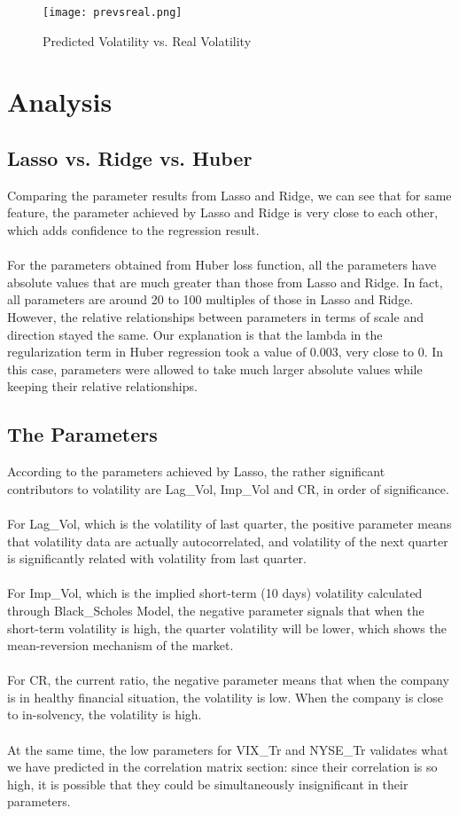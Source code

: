\documentclass[a4paper]{article}
\begin{document}
\begin{figure}[h]
\centering
\texttt{[image: prevsreal.png]}
\caption{\label{fig:scatter plot}Predicted Volatility vs. Real Volatility}
\end{figure}

\section{Analysis}
\subsection{Lasso vs. Ridge vs. Huber}
Comparing the parameter results from Lasso and Ridge, we can see that for same feature, the parameter achieved by Lasso and Ridge is very close to each other, which adds confidence to the regression result.
\\\\For the parameters obtained from Huber loss function, all the parameters have absolute values that are much greater than those from Lasso and Ridge. In fact, all parameters are around 20 to 100 multiples of those in Lasso and Ridge. However, the relative relationships between parameters in terms of scale and direction stayed the same. Our explanation is that the lambda in the regularization term in Huber regression took a value of 0.003, very close to 0. In this case, parameters were allowed to take much larger absolute values while keeping their relative relationships.
\subsection{The Parameters}
According to the parameters achieved by Lasso, the rather significant contributors to volatility are Lag\_Vol, Imp\_Vol and CR, in order of significance. 
\\\\For Lag\_Vol, which is the volatility of last quarter, the positive parameter means that volatility data are actually autocorrelated, and volatility of the next quarter is significantly related with volatility from last quarter.
\\\\For Imp\_Vol, which is the implied short-term (10 days) volatility calculated through Black\_Scholes Model, the negative parameter signals that when the short-term volatility is high, the quarter volatility will be lower, which shows the mean-reversion mechanism of the market.
\\\\For CR, the current ratio, the negative parameter means that when the company is in healthy financial situation, the volatility is low. When the company is close to in-solvency, the volatility is high.
\\\\At the same time, the low parameters for VIX\_Tr and NYSE\_Tr validates what we have predicted in the correlation matrix section: since their correlation is so high, it is possible that they could be simultaneously insignificant in their parameters.
\end{document}
